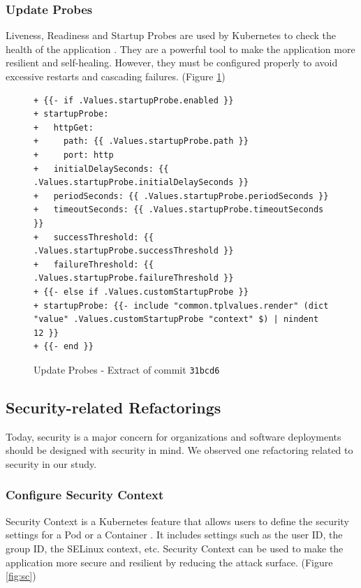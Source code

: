 \documentclass[conference]{IEEEtran}
\begin{document}
\subsubsection{Update Probes}
Liveness, Readiness and Startup Probes are used by Kubernetes to check the health of the application \cite{probes}. They are a powerful tool to make the application more resilient and self-healing. However, they must be configured properly to avoid excessive restarts and cascading failures. (Figure \ref{fig:probes})

\begin{figure}
    \begin{verbatim}
+ {{- if .Values.startupProbe.enabled }}
+ startupProbe:
+   httpGet:
+     path: {{ .Values.startupProbe.path }}
+     port: http
+   initialDelaySeconds: {{ .Values.startupProbe.initialDelaySeconds }}
+   periodSeconds: {{ .Values.startupProbe.periodSeconds }}
+   timeoutSeconds: {{ .Values.startupProbe.timeoutSeconds }}
+   successThreshold: {{ .Values.startupProbe.successThreshold }}
+   failureThreshold: {{ .Values.startupProbe.failureThreshold }}
+ {{- else if .Values.customStartupProbe }}
+ startupProbe: {{- include "common.tplvalues.render" (dict "value" .Values.customStartupProbe "context" $) | nindent 12 }}
+ {{- end }}
    \end{verbatim}
    \caption{Update Probes - Extract of commit \texttt{31bcd6}}
    \label{fig:probes}
\end{figure}

\subsection{Security-related Refactorings}

Today, security is a major concern for organizations and software deployments should be designed with security in mind. We observed one refactoring related to security in our study.

\subsubsection{Configure Security Context}
Security Context is a Kubernetes feature that allows users to define the security settings for a Pod or a Container \cite{secctx}. It includes settings such as the user ID, the group ID, the SELinux context, etc. Security Context can be used to make the application more secure and resilient by reducing the attack surface. (Figure \ref{fig:sc})
\end{document}

